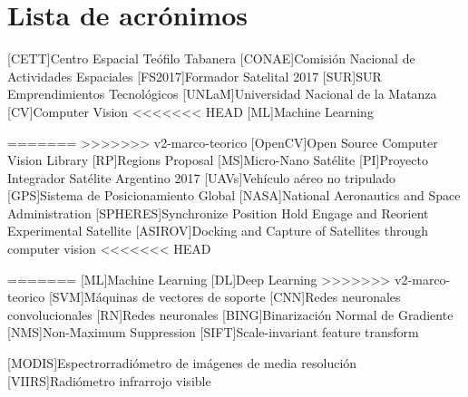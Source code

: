 \chapter*{Lista de acrónimos}
\label{chap:acronimos}

\begin{acronym}[SAOCOM]
[CETT]{Centro Espacial Teófilo Tabanera}
[CONAE]{Comisión Nacional de Actividades Espaciales}
[FS2017]{Formador Satelital 2017}
[SUR]{SUR Emprendimientos Tecnológicos}
[UNLaM]{Universidad Nacional de la Matanza}
[CV]{Computer Vision}
<<<<<<< HEAD
[ML]{Machine Learning}

=======
>>>>>>> v2-marco-teorico
[OpenCV]{Open Source Computer Vision Library}
[RP]{Regions Proposal}
[MS]{Micro-Nano Satélite}
[PI]{Proyecto Integrador Satélite Argentino 2017}
[UAVs]{Vehículo aéreo no tripulado}
[GPS]{Sistema de Posicionamiento Global}
[NASA]{National Aeronautics and Space Administration}
[SPHERES]{Synchronize Position Hold Engage and Reorient Experimental Satellite}
 [ASIROV]{Docking and Capture of Satellites through computer vision}
<<<<<<< HEAD

=======
[ML]{Machine Learning}
[DL]{Deep Learning}
>>>>>>> v2-marco-teorico
[SVM]{Máquinas de vectores de soporte}
[CNN]{Redes neuronales convolucionales}
[RN]{Redes neuronales}
[BING]{Binarización Normal de Gradiente}
[NMS]{Non-Maximum Suppression}
[SIFT]{Scale-invariant feature transform}

[MODIS]{Espectrorradiómetro de imágenes de media resolución}
[VIIRS]{Radiómetro infrarrojo visible}
\end{acronym}


